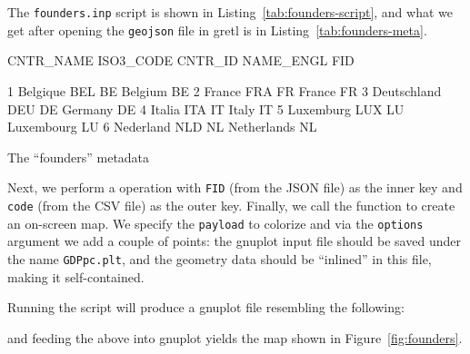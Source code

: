 \documentclass{article}
\begin{document}
The \texttt{founders.inp} script is shown in
Listing~\ref{tab:founders-script}, and what we get after opening the
\texttt{geojson} file in gretl is in Listing~\ref{tab:founders-meta}.

\begin{script}[htbp]
\begin{scode}
     CNTR_NAME    ISO3_CODE      CNTR_ID    NAME_ENGL          FID

1     Belgique          BEL           BE      Belgium           BE
2       France          FRA           FR       France           FR
3  Deutschland          DEU           DE      Germany           DE
4       Italia          ITA           IT        Italy           IT
5    Luxemburg          LUX           LU   Luxembourg           LU
6    Nederland          NLD           NL  Netherlands           NL
\end{scode}
\caption{The ``founders'' metadata}
\label{tab:founders-meta}
\end{script}

Next, we perform a  operation with \texttt{FID} (from the
JSON file) as the inner key and \texttt{code} (from the CSV file) as
the outer key. Finally, we call the  function to create
an on-screen map. We specify the \texttt{payload} to colorize and via
the \texttt{options} argument we add a couple of points: the
\textsf{gnuplot} input file should be saved under the name
\texttt{GDPpc.plt}, and the geometry data should be ``inlined'' in
this file, making it self-contained.

Running the script will produce a \textsf{gnuplot} file resembling the
following:


and feeding the above into \textsf{gnuplot} yields the map shown in
Figure~\ref{fig:founders}.
\end{document}
